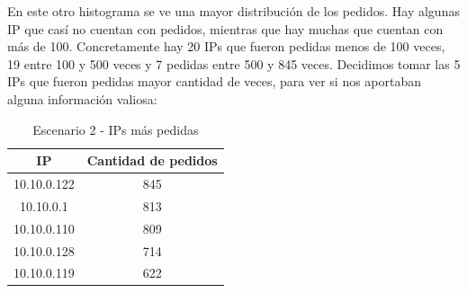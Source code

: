     \par En este otro histograma se ve una mayor distribución de los pedidos. Hay algunas IP que casí no cuentan con pedidos, mientras que hay muchas que cuentan con más de 100. Concretamente hay 20 IPs que fueron pedidas menos de 100 veces, 19 entre 100 y 500 veces y 7 pedidas entre 500 y 845 veces.
    Decidimos tomar las 5 IPs que fueron pedidas mayor cantidad de veces, para ver si nos aportaban alguna información valiosa:
        
    \begin{table}[!ht]
		\caption{Escenario 2 - IPs más pedidas}
		\centering
		\begin{tabular}{c c}
          IP & Cantidad de pedidos \\
          \hline 
          10.10.0.122 & 845 \\ 
          10.10.0.1 & 813 \\
          10.10.0.110 & 809 \\
          10.10.0.128 & 714 \\
          10.10.0.119 & 622 \\   
  		\end{tabular}
  	\end{table}
    
